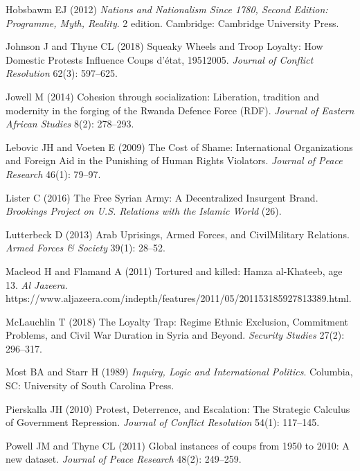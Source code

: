 \documentclass[
  12pt,
]{article}
\newlength{\cslhangindent}
\newenvironment{cslreferences}%
  {\setlength{\parindent}{0pt}%
  \everypar{\setlength{\hangindent}{\cslhangindent}}\ignorespaces}%
  {\par}
\begin{document}
\begin{cslreferences}
\leavevmode\hypertarget{ref-Hobsbawm2012}{}%
Hobsbawm EJ (2012) \emph{Nations and Nationalism Since 1780, Second Edition: Programme, Myth, Reality}. 2 edition. Cambridge: Cambridge University Press.

\leavevmode\hypertarget{ref-Johnson2018}{}%
Johnson J and Thyne CL (2018) Squeaky Wheels and Troop Loyalty: How Domestic Protests Influence Coups d'état, 19512005. \emph{Journal of Conflict Resolution} 62(3): 597--625.

\leavevmode\hypertarget{ref-Jowell2014}{}%
Jowell M (2014) Cohesion through socialization: Liberation, tradition and modernity in the forging of the Rwanda Defence Force (RDF). \emph{Journal of Eastern African Studies} 8(2): 278--293.

\leavevmode\hypertarget{ref-Lebovic2009}{}%
Lebovic JH and Voeten E (2009) The Cost of Shame: International Organizations and Foreign Aid in the Punishing of Human Rights Violators. \emph{Journal of Peace Research} 46(1): 79--97.

\leavevmode\hypertarget{ref-Lister2016}{}%
Lister C (2016) The Free Syrian Army: A Decentralized Insurgent Brand. \emph{Brookings Project on U.S. Relations with the Islamic World} (26).

\leavevmode\hypertarget{ref-Lutterbeck2013}{}%
Lutterbeck D (2013) Arab Uprisings, Armed Forces, and CivilMilitary Relations. \emph{Armed Forces \& Society} 39(1): 28--52.

\leavevmode\hypertarget{ref-Macleod2011}{}%
Macleod H and Flamand A (2011) Tortured and killed: Hamza al-Khateeb, age 13. \emph{Al Jazeera}. https://www.aljazeera.com/indepth/features/2011/05/201153185927813389.html.

\leavevmode\hypertarget{ref-McLauchlin2018}{}%
McLauchlin T (2018) The Loyalty Trap: Regime Ethnic Exclusion, Commitment Problems, and Civil War Duration in Syria and Beyond. \emph{Security Studies} 27(2): 296--317.

\leavevmode\hypertarget{ref-Most1989}{}%
Most BA and Starr H (1989) \emph{Inquiry, Logic and International Politics}. Columbia, SC: University of South Carolina Press.

\leavevmode\hypertarget{ref-Pierskalla2010}{}%
Pierskalla JH (2010) Protest, Deterrence, and Escalation: The Strategic Calculus of Government Repression. \emph{Journal of Conflict Resolution} 54(1): 117--145.

\leavevmode\hypertarget{ref-Powell2011}{}%
Powell JM and Thyne CL (2011) Global instances of coups from 1950 to 2010: A new dataset. \emph{Journal of Peace Research} 48(2): 249--259.


\end{cslreferences}
\end{document}
